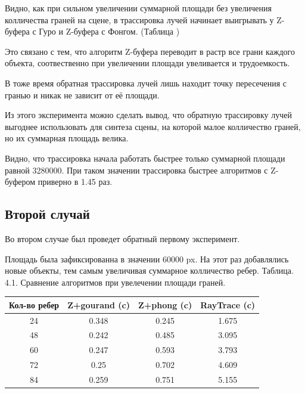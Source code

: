 \documentclass[12pt]{report}
\begin{document}
	Видно, как при сильном увеличении суммарной площади без увеличения колличества граней на сцене, в трассировка лучей начинает выигрывать у Z-буфера с Гуро и Z-буфера с Фонгом. (Таблица )
	
	Это связано с тем, что алгоритм Z-буфера переводит в растр все грани каждого объекта, соотвественно при увеличении площади увеливается и трудоемкость.
	
	В тоже время обратная трассировка лучей лишь находит точку пересечения с гранью и никак не зависит от её площади.
	
	Из этого эксперимента можно сделать вывод, что обратную трассировку лучей выгоднее использовать для синтеза сцены, на которой малое колличество граней, но их суммарная площадь велика.
	
	Видно, что трассировка начала работать быстрее только суммарной площади равной 3280000. При таком значении трассировка быстрее алгоритмов с Z-буфером приверно в 1.45 раз.
	
	\subsection{Второй случай}
	
	Во втором случае был проведет обратный первому эксперимент. 
	
	Площадь была зафиксированна в значении 60000 px. На этот раз добавлялись новые объекты, тем самым увеличивая суммарное колличество ребер.
	\newpage
		Таблица. 4.1. Сравнение алгоритмов при увелечении площади граней.
	
	\begin{center}
		\begin{tabular}{|c c c c|}
			\hline
			Кол-во ребер & Z+gourand (c) & Z+phong (c) & RayTrace (c) \\ [0.5ex]
			\hline
			24 & 0.348 & 0.245 & 1.675 \\ 
			\hline 
			48 & 0.242 & 0.485 & 3.095 \\ 
			\hline 
			60 & 0.247 & 0.593 & 3.793 \\ 
			\hline 
			72 & 0.25 & 0.702 & 4.609 \\ 
			\hline 
			84 & 0.259 & 0.751 & 5.155 \\ 
			\hline
		\end{tabular}
	\end{center}
\end{document}
